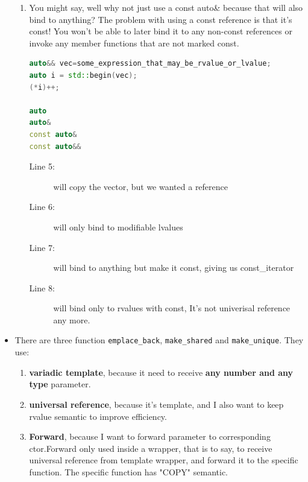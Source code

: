 \documentclass[a4paper,11pt,twoside]{book}
\begin{document}
\begin{itemize}
\begin{enumerate}
		\item You might say, well why not just use a const auto\& because that will also bind to anything? The problem with using a const reference is that it's const! You won't be able to later bind it to any non-const references or invoke any member functions that are not marked const.
\begin{lstlisting}[frame=single, language=c++]
auto&& vec=some_expression_that_may_be_rvalue_or_lvalue;
auto i = std::begin(vec);
(*i)++;

auto         
auto&       
const auto&
const auto&& 
\end{lstlisting} 
\begin{description}
	\item[Line 5:] will copy the vector, but we wanted a reference
	\item[Line 6:] will only bind to modifiable lvalues
	\item[Line 7:] will bind to anything but make it const, giving us const\_iterator
	\item[Line 8:] will bind only to rvalues with const, It's not univerisal reference any more.
\end{description}
	\end{enumerate}

\item There are three function \texttt{emplace\_back}, \texttt{make\_shared} and \texttt{make\_unique}. They use:
	\begin{enumerate}
		\item \textbf{variadic template}, because it need to receive \textbf{any number and any type} parameter.

		\item \textbf{universal reference}, because it's template, and I also want to keep rvalue semantic to improve efficiency. 
		
		\item \textbf{Forward}, because I want to forward parameter to corresponding ctor.Forward only used inside a wrapper, that is to say, to receive universal reference from template wrapper, and forward it to the specific function. The specific function has "COPY" semantic. 
	\end{enumerate}
\end{itemize}
\end{document}
